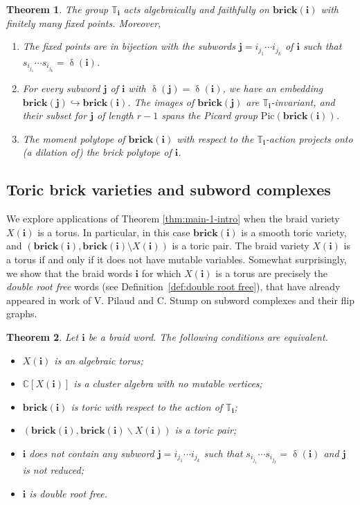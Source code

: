 \documentclass[a4paper, 11pt]{amsart}
\newcommand{\brick}{\mathbf{brick}}
\newcommand{\word}[1]{\mathbf{#1}}
\DeclareMathOperator{\dem}{\delta}
\newcommand{\Pic}{\mathrm{Pic}}
\newcommand{\dil}[1]{\mathbb{T}_{#1}}
\newtheorem{theorem}{Theorem}[section]
\theoremstyle{definition}
\begin{document}
\begin{theorem} \label{thm:intro_properties_of_the_action}
The group $\dil{\word{i}}$ acts algebraically and faithfully on $\brick(\word{i})$ with finitely many fixed points. Moreover,
\begin{enumerate}
    \item The fixed points are in bijection with the subwords $\word{j} = i_{j_1}\cdots i_{j_{k}}$ of $\word{i}$ such that $s_{i_{j_1}}\cdots s_{i_{j_k}} = \dem(\word{i})$. 
    \item For every subword $\word{j}$ of $\word{i}$ with $\dem(\word{j}) = \dem(\word{i})$, we have an embedding $\brick(\word{j}) \hookrightarrow \brick(\word{i})$. The images of $\brick(\word{j})$ are $\dil{\word{i}}$-invariant, and their subset for $\word{j}$ of length $r - 1$ spans the Picard group $\Pic(\brick(\word{i}))$. 
    \item The moment polytope of $\brick(\word{i})$ with respect to the $\dil{\word{i}}$-action projects onto (a dilation of) the brick polytope of $\word{i}$.
\end{enumerate}
\end{theorem}

\subsection{Toric brick varieties and subword complexes} We explore applications of Theorem \ref{thm:main-1-intro} when the braid variety $X(\word{i})$ is a torus. In particular, in this case $\brick(\word{i})$ is a smooth toric variety, and $(\brick(\word{i}), \brick(\word{i})\setminus X(\word{i}))$ is a toric pair. The braid variety $X(\word{i})$ is a torus if and only if it does not have mutable variables. Somewhat surprisingly, we show that the braid words $\word{i}$ for which $X(\word{i})$ is a torus are precisely the \emph{double root free} words (see Definition~\ref{def:double root free}), that have already appeared in work of V. Pilaud and C. Stump \cite{PilaudStump-EL} on subword complexes and their flip graphs. 

\begin{theorem}\label{thm:toric-brick-intro}
    Let $\word{i}$ be a braid word. The following conditions are equivalent. 
    \begin{itemize}
\item[(a)] $X(\word{i})$ is an algebraic torus;
\item[(b)] $\mathbb{C}[X(\word{i})]$ is a cluster algebra with no mutable vertices;
\item[(c)] $\brick(\word{i})$ is toric with respect to the action of $\dil{\word{i}}$;
\item[(d)] $(\brick(\word{i}), \brick(\word{i}) \backslash X(\word{i}))$ is a toric pair;
\item[(e)] $\word{i}$ does not contain any subword $\word{j} = i_{j_1}\cdots i_{j_k}$ such that $s_{i_{j_1}}\cdots s_{i_{j_k}} = \dem(\word{i})$ and $\word{j}$ is not reduced;
\item[(f)] $\word{i}$ is double root free.
\end{itemize}
\end{theorem}
\end{document}
